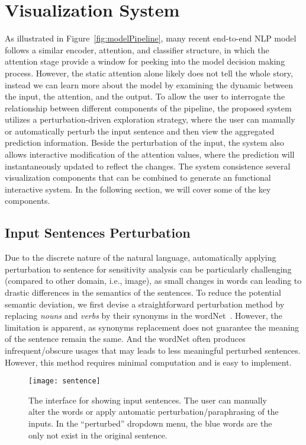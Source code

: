 
\section{Visualization System}
As illustrated in Figure~\ref{fig:modelPipeline}, many recent end-to-end NLP model follows a similar encoder, attention, and classifier structure, in which the attention stage provide a window for peeking into the model decision making process. However, the static attention alone likely does not tell the whole story, instead we can learn more about the model by examining the dynamic between the input, the attention, and the output. To allow the user to interrogate the relationship between different components of the pipeline, the proposed system utilizes a perturbation-driven exploration strategy, where the user can manually or automatically perturb the input sentence and then view the aggregated prediction information. Beside the perturbation of the input, the system also allows interactive modification of the attention values, where the prediction will instantaneously updated to reflect the changes. 
%
The system consistence several visualization components that can be combined to generate an functional interactive system. In the following section, we will cover some of the key components.

\subsection{Input Sentences Perturbation}
\label{sec:perturb}
Due to the discrete nature of the natural language, automatically applying perturbation to sentence for sensitivity analysis can be particularly challenging (compared to other domain, i.e., image), as small changes in words can leading to drastic differences in the semantics of the sentences.
To reduce the potential semantic deviation, we first devise a straightforward perturbation method by replacing \emph{nouns} and \emph{verbs} by their synonyms in the wordNet~\cite{Miller1995}. However, the limitation is apparent, as synonyms replacement does not guarantee the meaning of the sentence remain the same. And the wordNet often produces infrequent/obscure usages that may leads to less meaningful perturbed sentences. However, this method requires minimal computation and is easy to implement. 

\begin{figure}[htbp]
\centering
\vspace{-2mm}
 \texttt{[image: sentence]}
 \vspace{-2mm}
 \caption{
The interface for showing input sentences. The user can manually alter the words or apply automatic perturbation/paraphrasing of the inputs. In the ``perturbed'' dropdown menu, the blue words are the only not exist in the original sentence.
 }
 \vspace{-1mm}
\label{fig:sentence}
\end{figure}

